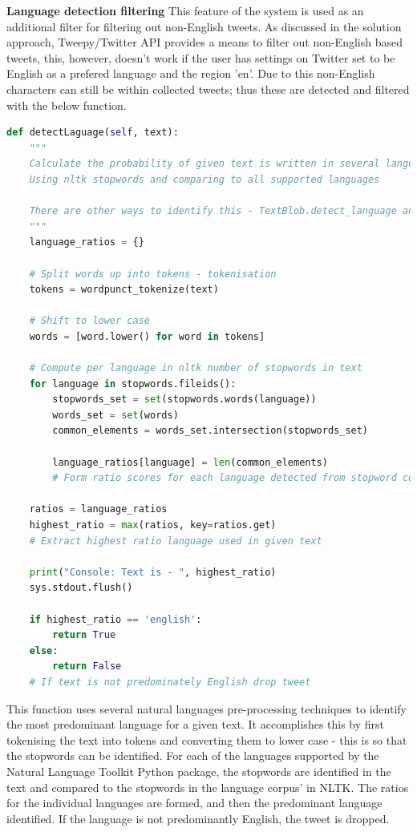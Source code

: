 \documentclass[oneside, 12pt]{article}
\begin{document}
			\textbf{Language detection filtering}
			This feature of the system is used as an additional filter for filtering out non-English tweets. As discussed in the solution approach, Tweepy/Twitter API provides a means to filter out non-English based tweets, this, however, doesn't work if the user has settings on Twitter set to be English as a prefered language and the region 'en'. Due to this non-English characters can still be within collected tweets; thus these are detected and filtered with the below function.
			
			\begin{lstlisting}[language=python, caption=Language detection and filter function \cite{36}]
def detectLaguage(self, text):
	"""
	Calculate the probability of given text is written in several languages
	Using nltk stopwords and comparing to all supported languages

	There are other ways to identify this - TextBlob.detect_language and Ngrams
	"""
	language_ratios = {}
	
	# Split words up into tokens - tokenisation
	tokens = wordpunct_tokenize(text)
	
	# Shift to lower case
	words = [word.lower() for word in tokens]

	# Compute per language in nltk number of stopwords in text
	for language in stopwords.fileids():
		stopwords_set = set(stopwords.words(language))
		words_set = set(words)
		common_elements = words_set.intersection(stopwords_set)

		language_ratios[language] = len(common_elements) 
		# Form ratio scores for each language detected from stopword comparison

	ratios = language_ratios
	highest_ratio = max(ratios, key=ratios.get)
	# Extract highest ratio language used in given text

	print("Console: Text is - ", highest_ratio)
	sys.stdout.flush()

	if highest_ratio == 'english':
		return True
	else:
		return False
	# If text is not predominately English drop tweet
			\end{lstlisting}
			
			This function uses several natural languages pre-processing techniques to identify the most predominant language for a given text. It accomplishes this by first tokenising the text into tokens and converting them to lower case - this is so that the stopwords can be identified. For each of the languages supported by the Natural Language Toolkit Python package, the stopwords are identified in the text and compared to the stopwords in the language corpus' in NLTK. The ratios for the individual languages are formed, and then the predominant language identified. If the language is not predominantly English, the tweet is dropped.
			
\end{document}
